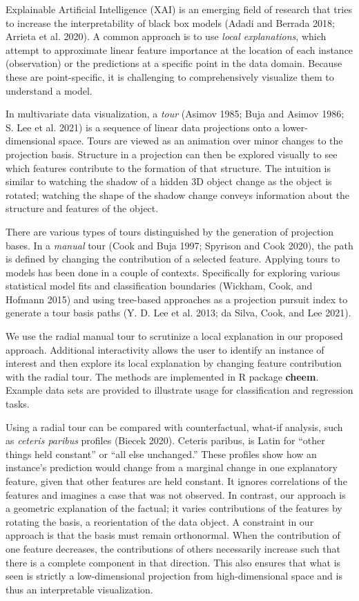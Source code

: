 \documentclass[11pt,twoside]{article}
\begin{document}
Explainable Artificial Intelligence (XAI) is an emerging field of research that tries to increase the interpretability of black box models (Adadi and Berrada 2018; Arrieta et al. 2020). A common approach is to use \emph{local explanations}, which attempt to approximate linear feature importance at the location of each instance (observation) or the predictions at a specific point in the data domain. Because these are point-specific, it is challenging to comprehensively visualize them to understand a model.

In multivariate data visualization, a \emph{tour} (Asimov 1985; Buja and Asimov 1986; S. Lee et al. 2021) is a sequence of linear data projections onto a lower-dimensional space. Tours are viewed as an animation over minor changes to the projection basis. Structure in a projection can then be explored visually to see which features contribute to the formation of that structure. The intuition is similar to watching the shadow of a hidden 3D object change as the object is rotated; watching the shape of the shadow change conveys information about the structure and features of the object.

There are various types of tours distinguished by the generation of projection bases. In a \emph{manual} tour (Cook and Buja 1997; Spyrison and Cook 2020), the path is defined by changing the contribution of a selected feature. Applying tours to models has been done in a couple of contexts. Specifically for exploring various statistical model fits and classification boundaries (Wickham, Cook, and Hofmann 2015) and using tree-based approaches as a projection pursuit index to generate a tour basis paths (Y. D. Lee et al. 2013; da Silva, Cook, and Lee 2021).

We use the radial manual tour to scrutinize a local explanation in our proposed approach. Additional interactivity allows the user to identify an instance of interest and then explore its local explanation by changing feature contribution with the radial tour. The methods are implemented in R package \textbf{cheem}. Example data sets are provided to illustrate usage for classification and regression tasks.

Using a radial tour can be compared with counterfactual, what-if analysis, such as \emph{ceteris paribus} profiles (Biecek 2020). Ceteris paribus, is Latin for ``other things held constant'' or ``all else unchanged.'' These profiles show how an instance's prediction would change from a marginal change in one explanatory feature, given that other features are held constant. It ignores correlations of the features and imagines a case that was not observed. In contrast, our approach is a geometric explanation of the factual; it varies contributions of the features by rotating the basis, a reorientation of the data object. A constraint in our approach is that the basis must remain orthonormal. When the contribution of one feature decreases, the contributions of others necessarily increase such that there is a complete component in that direction. This also ensures that what is seen is strictly a low-dimensional projection from high-dimensional space and is thus an interpretable visualization.
\end{document}
